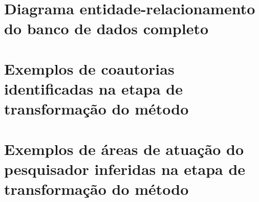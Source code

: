 \begin{apendicesenv}
\chapter{Diagrama entidade-relacionamento do banco de dados completo}

\chapter{Exemplos de coautorias identificadas na etapa de transformação do método}

\chapter{Exemplos de áreas de atuação do pesquisador inferidas na etapa de transformação do método}

\end{apendicesenv}
